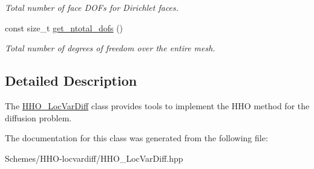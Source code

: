 \begin{DoxyCompactItemize}
\begin{DoxyCompactList}\small\item\em Total number of face D\+O\+Fs for Dirichlet faces. \end{DoxyCompactList}\item 
\mbox{\label{classHArDCore3D_1_1HHO__LocVarDiff_a9240e104e5b96b06040bb0f6a2e13514}} 
const size\+\_\+t \hyperlink{classHArDCore3D_1_1HHO__LocVarDiff_a9240e104e5b96b06040bb0f6a2e13514}{get\+\_\+ntotal\+\_\+dofs} ()
\begin{DoxyCompactList}\small\item\em Total number of degrees of freedom over the entire mesh. \end{DoxyCompactList}\end{DoxyCompactItemize}


\subsection{Detailed Description}
The \hyperlink{classHArDCore3D_1_1HHO__LocVarDiff}{H\+H\+O\+\_\+\+Loc\+Var\+Diff} class provides tools to implement the H\+HO method for the diffusion problem. 

The documentation for this class was generated from the following file\+:\begin{DoxyCompactItemize}
\item 
Schemes/\+H\+H\+O-\/locvardiff/H\+H\+O\+\_\+\+Loc\+Var\+Diff.\+hpp\end{DoxyCompactItemize}
